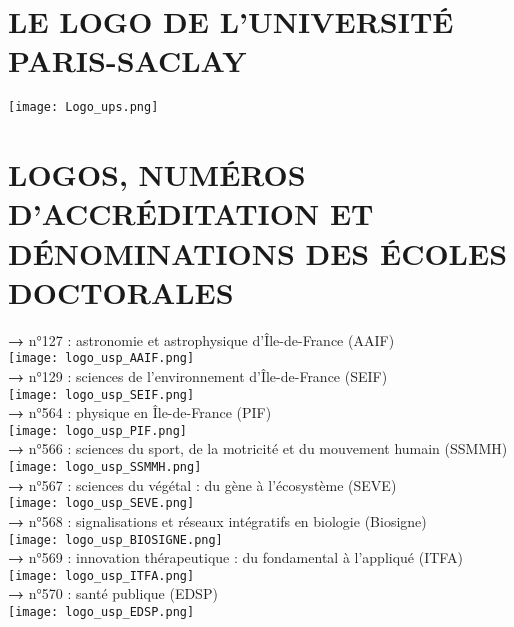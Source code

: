\documentclass[french,12pt,a4paper]{book}
\begin{document}
\section{LE LOGO DE L’UNIVERSITÉ PARIS-SACLAY}
\noindent \texttt{[image: Logo\_ups.png]}
\section{LOGOS, NUMÉROS D’ACCRÉDITATION ET DÉNOMINATIONS DES ÉCOLES DOCTORALES}

\noindent \textbf{\color{Prune}→} n°127 : astronomie et astrophysique d'Île-de-France (AAIF) \\
\texttt{[image: logo\_usp\_AAIF.png]}\\

\noindent \textbf{\color{Prune}→} n°129 : sciences de l'environnement d’Île-de-France (SEIF) \\
\texttt{[image: logo\_usp\_SEIF.png]}\\

\noindent \textbf{\color{Prune}→} n°564 : physique en Île-de-France (PIF)\\    \texttt{[image: logo\_usp\_PIF.png]}\\

\noindent \textbf{\color{Prune}→} n°566 : sciences du sport, de la motricité et du mouvement humain (SSMMH)\\
\texttt{[image: logo\_usp\_SSMMH.png]}\\
\newpage
\noindent \textbf{\color{Prune}→} n°567 : sciences du végétal : du gène à l'écosystème (SEVE)\\
\texttt{[image: logo\_usp\_SEVE.png]}\\

\noindent \textbf{\color{Prune}→} n°568 : signalisations et réseaux intégratifs en biologie (Biosigne)\\
\texttt{[image: logo\_usp\_BIOSIGNE.png]}\\

\noindent \textbf{\color{Prune}→} n°569 : innovation thérapeutique : du fondamental à l'appliqué (ITFA)\\    \texttt{[image: logo\_usp\_ITFA.png]}\\

\noindent \textbf{\color{Prune}→} n°570 : santé publique (EDSP)\\
\texttt{[image: logo\_usp\_EDSP.png]}\\
\end{document}
